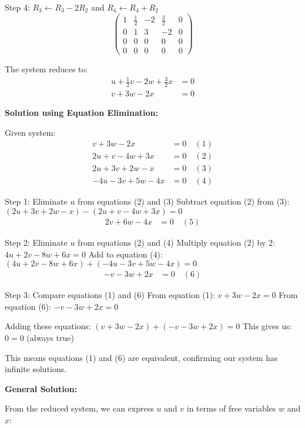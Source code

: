 Step 4: $R_3 \leftarrow R_3 - 2R_2$ and $R_4 \leftarrow R_4 + R_2$
\[
	\left(\begin{array}{cccc|c}
			1 & \frac{1}{2} & -2 & \frac{3}{2} & 0 \\
			0 & 1           & 3  & -2          & 0 \\
			0 & 0           & 0  & 0           & 0 \\
			0 & 0           & 0  & 0           & 0
		\end{array}\right)
\]

The system reduces to:
\begin{align*}
	u + \frac{1}{2}v - 2w + \frac{3}{2}x & = 0 \\
	v + 3w - 2x                          & = 0
\end{align*}

\textbf{Solution using Equation Elimination:}

Given system:
\begin{align}
	v + 3w - 2x        & = 0 \quad (1) \\
	2u + v - 4w + 3x   & = 0 \quad (2) \\
	2u + 3v + 2w - x   & = 0 \quad (3) \\
	-4u - 3v + 5w - 4x & = 0 \quad (4)
\end{align}

Step 1: Eliminate $u$ from equations (2) and (3)
Subtract equation (2) from (3): $(2u + 3v + 2w - x) - (2u + v - 4w + 3x) = 0$
\begin{align}
	2v + 6w - 4x & = 0 \quad (5)
\end{align}

Step 2: Eliminate $u$ from equations (2) and (4)
Multiply equation (2) by 2: $4u + 2v - 8w + 6x = 0$
Add to equation (4): $(4u + 2v - 8w + 6x) + (-4u - 3v + 5w - 4x) = 0$
\begin{align}
	-v - 3w + 2x & = 0 \quad (6)
\end{align}

Step 3: Compare equations (1) and (6)
From equation (1): $v + 3w - 2x = 0$
From equation (6): $-v - 3w + 2x = 0$

Adding these equations: $(v + 3w - 2x) + (-v - 3w + 2x) = 0$
This gives us: $0 = 0$ (always true)

This means equations (1) and (6) are equivalent, confirming our system has infinite solutions.

\textbf{General Solution:}

From the reduced system, we can express $u$ and $v$ in terms of free variables $w$ and $x$:

